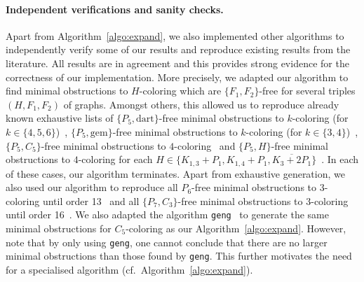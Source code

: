 \documentclass[11pt,a4paper]{article}
\theoremstyle{mystyle}
\begin{document}
\paragraph{Independent verifications and sanity checks.}
Apart from Algorithm~\ref{algo:expand}, we also implemented other algorithms to independently verify some of our results and reproduce existing results from the literature. All results are in agreement and this provides strong evidence for the correctness of our implementation. More precisely, we adapted our algorithm to find minimal obstructions to $H$-coloring which are $\{F_1,F_2\}$-free for several triples $(H,F_1,F_2)$ of graphs.
Amongst others, this allowed us to reproduce already known exhaustive lists of
$\{P_5,\text{dart}\}$-free minimal obstructions to $k$-coloring (for $k \in \{4,5,6\}$)~\cite{DBLP:conf/cocoa/XiaJGH23}, 
$\{P_5,\text{gem}\}$-free minimal obstructions to $k$-coloring (for $k \in \{3,4\}$)~\cite{DBLP:journals/dam/CaiGH23}, 
$\{P_5,C_5\}$-free minimal obstructions to $4$-coloring~\cite{DBLP:journals/dam/HoangMRSV15} and $\{P_5,H\}$-free minimal obstructions to $4$-coloring for each $H \in \{K_{1,3}+P_1,K_{1,4}+P_1,\overline{K_3+2P_1}\}$~\cite{DBLP:journals/corr/abs-2403-05611}. In each of these cases, our algorithm terminates. Apart from exhaustive generation, we also used our algorithm to reproduce all $P_6$-free minimal obstructions to $3$-coloring until order 13~\cite{DBLP:journals/jct/ChudnovskyGSZ20} and all $\{P_7,C_3\}$-free minimal obstructions to $3$-coloring until order 16~\cite{DBLP:journals/jgt/GoedgebeurS18}. We also adapted the algorithm \texttt{geng}~\cite{DBLP:journals/jsc/McKayP14} to generate the same minimal obstructions for $C_5$-coloring as our Algorithm~\ref{algo:expand}. However, note that by only using \texttt{geng}, one cannot conclude that there are no larger minimal obstructions than those found by \texttt{geng}. This further motivates the need for a specialised algorithm (cf.\ Algorithm~\ref{algo:expand}).
\end{document}
